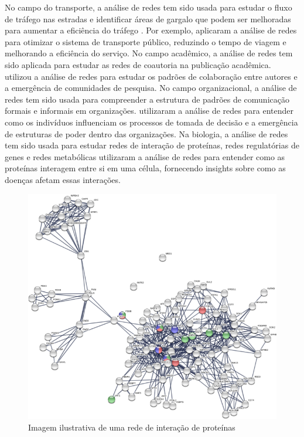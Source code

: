 No campo do transporte, a análise de redes tem sido usada para estudar o fluxo de tráfego nas estradas e identificar áreas de gargalo que podem ser melhoradas para aumentar a eficiência do tráfego \cite[]{2012_Levinson}. Por exemplo,  aplicaram a análise de redes para otimizar o sistema de transporte público, reduzindo o tempo de viagem e melhorando a eficiência do serviço. No campo acadêmico, a análise de redes tem sido aplicada para estudar as redes de coautoria na publicação acadêmica.  utilizou a análise de redes para estudar os padrões de colaboração entre autores e a emergência de comunidades de pesquisa. No campo organizacional, a análise de redes tem sido usada para compreender a estrutura de padrões de comunicação formais e informais em organizações.  utilizaram a análise de redes para entender como os indivíduos influenciam os processos de tomada de decisão e a emergência de estruturas de poder dentro das organizações. Na biologia, a análise de redes tem sido usada para estudar redes de interação de proteínas, redes regulatórias de genes e redes metabólicas  utilizaram a análise de redes para entender como as proteínas interagem entre si em uma célula, fornecendo insights sobre como as doenças afetam essas interações.
\begin{figure}[!htb]
	\caption{Imagem ilustrativa de uma rede de interação de proteínas}
	\label{fig:network_proteins}
	\centering
	\includegraphics[scale=0.5]{images/network_proteins.png}
\end{figure}

